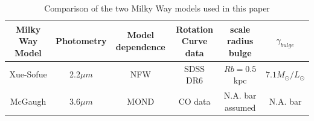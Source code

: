\documentclass[reprint,%
 amsmath,amssymb,
 aps,
]{revtex4-1}
\begin{document}
   
   

 
    
  
  
  
  \begin{table}[]
      \centering
       \caption{Comparison of the two Milky Way models used in this paper}
      \label{tab:MWcompare}
       \begin{tabular}{|c|c|c|c|c|c|}
      \hline
        Milky Way Model & Photometry                        & Model dependence  & Rotation Curve data & scale radius bulge &$\gamma_{bulge}$\\
 \hline
Xue-Sofue     
&  2.2$ \mu m$
& NFW \cite{1996ApJ...462..563N}     
&SDSS DR6  \cite{Xue}       
& $Rb = 0.5$ kpc    
&$  7.1 M_\odot /L_\odot$  \\
  \hline
 McGaugh       
 & 3.6$\mu m$ 
 &MOND \cite{Milgrom}
 & CO data  \cite{2006ApJ...641..938L}                            
 &  N.A.  bar assumed
 & N.A. bar\\
         \hline
      \end{tabular}
     
  \end{table}
  


\end{document}
